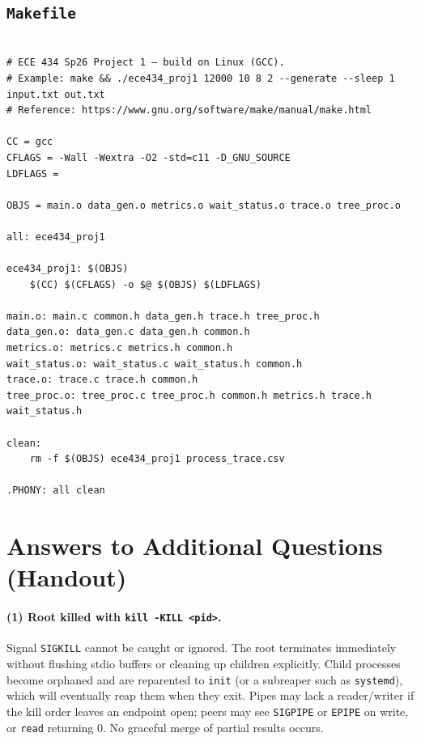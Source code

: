 \documentclass[11pt,a4paper]{article}
\begin{document}
\subsection{\texttt{Makefile}}

\lstset{style=textbookmake}\begin{lstlisting}[caption={File \texttt{Makefile}},label=lst:Makefile]

# ECE 434 Sp26 Project 1 — build on Linux (GCC).
# Example: make && ./ece434_proj1 12000 10 8 2 --generate --sleep 1 input.txt out.txt
# Reference: https://www.gnu.org/software/make/manual/make.html

CC = gcc
CFLAGS = -Wall -Wextra -O2 -std=c11 -D_GNU_SOURCE
LDFLAGS =

OBJS = main.o data_gen.o metrics.o wait_status.o trace.o tree_proc.o

all: ece434_proj1

ece434_proj1: $(OBJS)
	$(CC) $(CFLAGS) -o $@ $(OBJS) $(LDFLAGS)

main.o: main.c common.h data_gen.h trace.h tree_proc.h
data_gen.o: data_gen.c data_gen.h common.h
metrics.o: metrics.c metrics.h common.h
wait_status.o: wait_status.c wait_status.h common.h
trace.o: trace.c trace.h common.h
tree_proc.o: tree_proc.c tree_proc.h common.h metrics.h trace.h wait_status.h

clean:
	rm -f $(OBJS) ece434_proj1 process_trace.csv

.PHONY: all clean

\end{lstlisting}\clearpage

\section{Answers to Additional Questions (Handout)}

\paragraph{(1) Root killed with \texttt{kill -KILL <pid>}.}
Signal \texttt{SIGKILL} cannot be caught or ignored. The root terminates immediately without flushing stdio buffers or cleaning up children explicitly. Child processes become orphaned and are reparented to \texttt{init} (or a subreaper such as \texttt{systemd}), which will eventually reap them when they exit. Pipes may lack a reader/writer if the kill order leaves an endpoint open; peers may see \texttt{SIGPIPE} or \texttt{EPIPE} on write, or \texttt{read} returning 0. No graceful merge of partial results occurs.
\end{document}
